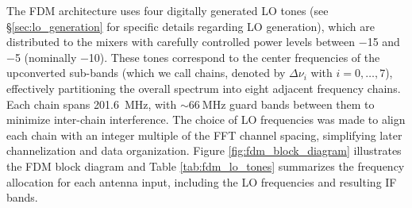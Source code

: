 The FDM architecture uses four digitally generated LO tones (see \S \ref{sec:lo_generation} for specific details regarding LO generation), which are distributed to the mixers with carefully controlled power levels between \qty{-15}{\decibelm} and \qty{-5}{\decibelm} (nominally \SI{-10}{\decibelm}). These tones correspond to the center frequencies of the upconverted sub-bands (which we call chains, denoted by $\Delta\nu_i$ with $i=0,\dots,7$), effectively partitioning the overall spectrum into eight adjacent frequency chains. Each chain spans \SI{201.6}{\mega\hertz}, with $\sim\SI{66}{\mega\hertz}$ guard bands between them to minimize inter-chain interference. The choice of LO frequencies was made to align each chain with an integer multiple of the FFT channel spacing, simplifying later channelization and data organization. Figure \ref{fig:fdm_block_diagram} illustrates the FDM block diagram and Table \ref{tab:fdm_lo_tones} summarizes the frequency allocation for each antenna input, including the LO frequencies and resulting IF bands.

